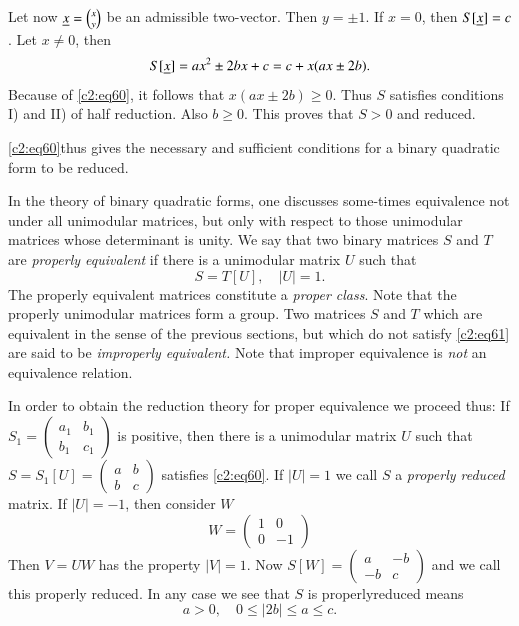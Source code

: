 Let now $\underline{x}=\binom{x}{y}$ be an admissible two-vector. Then $y=\pm
1$. If $x=0$, then $S[\underline{x}]=c$. Let $x\neq 0$, then
$$
S[\underline{x}]=ax^{2}\pm 2bx+c=c+x(ax\pm 2b).
$$
Because of \eqref{c2:eq60}, it follows that $x(ax\pm 2b)\geq 0$. Thus $S$
satisfies conditions I) and II) of half reduction. Also $b\geq
0$. This proves that $S>0$ and reduced.

\eqref{c2:eq60}\pageoriginale thus gives the necessary and sufficient
conditions for a binary quadratic form to be reduced.

In the theory of binary quadratic forms, one discusses some-times
equivalence not under all unimodular matrices, but only with respect
to those unimodular matrices whose determinant is unity. We say that
two binary matrices $S$ and $T$ are {\em properly equivalent} if there
is a unimodular matrix $U$ such that
\begin{equation*}
S=T[U],\quad |U|=1.\tag{61}\label{c2:eq61}
\end{equation*}
The properly equivalent matrices constitute a {\em proper class}. Note
that the properly unimodular matrices form a group. Two matrices $S$
and $T$ which are equivalent in the sense of the previous sections,
but which do not satisfy \eqref{c2:eq61} are said to be {\em improperly
  equivalent.} Note that improper equivalence is {\em not} an
equivalence relation.

In order to obtain the reduction theory for proper equivalence we
proceed thus: If $S_{1}=\left(\begin{smallmatrix} a_{1} &
  b_{1}\\ b_{1} & c_{1}\end{smallmatrix}\right)$ is positive, then
there is a unimodular matrix $U$ such that
$S=S_{1}[U]=\left(\begin{smallmatrix} a & b\\ b &
  c\end{smallmatrix}\right)$ satisfies \eqref{c2:eq60}. If $|U|=1$ we call
  $S$ a {\em properly reduced} matrix. If $|U|=-1$, then consider $W$
\begin{equation*}
W=
\begin{pmatrix}
1 & 0\\
0 & -1
\end{pmatrix}\tag{62}\label{c2:eq62}
\end{equation*}
Then $V=UW$ has the property $|V|=1$. Now
$S[W]=\left(\begin{smallmatrix} a & -b\\ -b &
  c\end{smallmatrix}\right)$ and we call this properly reduced. In any
  case we see that $S$ is properly\pageoriginale reduced means
\begin{equation*}
a>0,\quad 0\leq |2b|\leq a\leq c.\tag{63}\label{c2:eq63}
\end{equation*}

